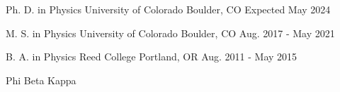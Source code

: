 

\begin{cventries}
  \cventry
  {Ph. D. in Physics}
  {University of Colorado}
  {Boulder, CO}
  {Expected May 2024}
  {}

  \cventry
  {M. S. in Physics}
  {University of Colorado}
  {Boulder, CO}
  {Aug. 2017 - May 2021}
  {}

  \cventry
{B. A. in Physics} %
{Reed College} %
{Portland, OR} %
{Aug. 2011 - May 2015} %
{\begin{cvitems}
\item {Phi Beta Kappa}
\end{cvitems}
}

\end{cventries}
